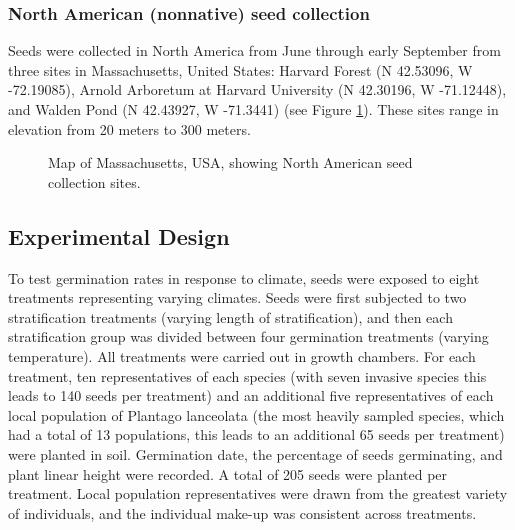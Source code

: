 \documentclass[12pt]{article}\usepackage[]{graphicx}\usepackage[]{color}
\begin{document}
	\subsubsection{North American (nonnative) seed collection} Seeds were collected in North America from June through early September from three sites in Massachusetts, United States:  Harvard Forest (N 42.53096, W -72.19085), Arnold Arboretum at Harvard University (N 42.30196, W -71.12448), and Walden Pond (N 42.43927, W -71.3441) (see Figure \ref{fig:us}). These sites range in elevation from 20 meters to 300 meters. 
	\begin{figure}
		\centering
		\caption{Map of Massachusetts, USA, showing North American seed collection sites. }
		\label{fig:us}
	\end{figure}		
	
	\subsection{Experimental Design}
	To test germination rates in response to climate, seeds were exposed to eight treatments representing varying climates. Seeds were first subjected to two stratification treatments (varying length of stratification), and then each stratification group was divided between four germination treatments (varying temperature). All treatments were carried out in growth chambers. For each treatment, ten representatives of each species (with seven invasive species this leads to 140 seeds per treatment) and an additional five representatives of each local population of Plantago lanceolata (the most heavily sampled species, which had a total of 13 populations, this leads to an additional 65 seeds per treatment) were planted in soil. Germination date, the percentage of seeds germinating, and plant linear height were recorded.  A total of 205 seeds were planted per treatment.  Local population representatives were drawn from the greatest variety of individuals, and the individual make-up was consistent across treatments. 
	
\end{document}
